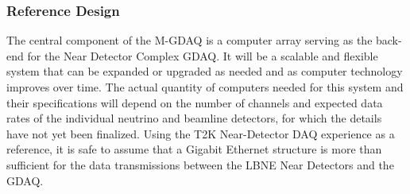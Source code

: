 
\subsubsection{Reference Design}

The central component of the M-GDAQ is a computer array serving as the 
back-end for the Near Detector Complex GDAQ. It will be a scalable and 
flexible system that can be expanded or upgraded as needed and as 
computer technology improves over time. The actual %
quantity of computers needed for this system and their
specifications will depend on the %
number of channels and expected data rates of the individual %
neutrino
and beamline detectors, %
for which the details have not yet been finalized. 
Using the T2K Near-Detector DAQ experience as a reference, 
it is safe to assume that a Gigabit Ethernet structure is more than sufficient for the 
data transmissions between %
the LBNE Near Detectors and the GDAQ.

